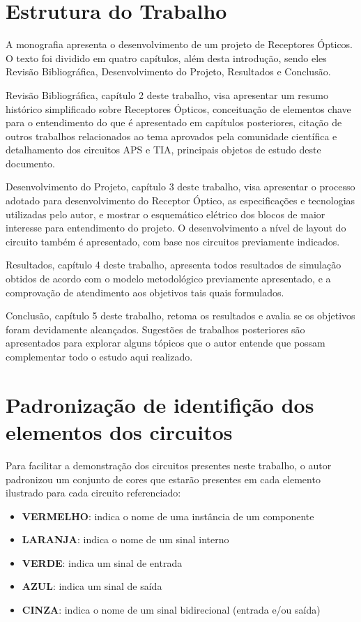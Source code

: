 \section{Estrutura do Trabalho}

A monografia apresenta o desenvolvimento de um projeto de Receptores Ópticos. O texto foi dividido em quatro capítulos, além desta introdução, sendo eles Revisão Bibliográfica, Desenvolvimento do Projeto, Resultados e Conclusão.

Revisão Bibliográfica, capítulo 2 deste trabalho, visa apresentar um resumo histórico simplificado sobre Receptores Ópticos, conceituação de elementos chave para o entendimento do que é apresentado em capítulos posteriores, citação de outros trabalhos relacionados ao tema aprovados pela comunidade científica e detalhamento dos circuitos APS e TIA, principais objetos de estudo deste documento.

Desenvolvimento do Projeto, capítulo 3 deste trabalho, visa apresentar o processo adotado para desenvolvimento do Receptor Óptico, as especificações e tecnologias utilizadas pelo autor, e mostrar o esquemático elétrico dos blocos de maior interesse para entendimento do projeto. O desenvolvimento a nível de layout do circuito também é apresentado, com base nos circuitos previamente indicados.

Resultados, capítulo 4 deste trabalho, apresenta todos resultados de simulação obtidos de acordo com o modelo metodológico previamente apresentado, e a comprovação de atendimento aos objetivos tais quais formulados.

Conclusão, capítulo 5 deste trabalho, retoma os resultados e avalia se os objetivos foram devidamente alcançados. Sugestões de trabalhos posteriores são apresentados para explorar alguns tópicos que o autor entende que possam complementar todo o estudo aqui realizado.

\section{Padronização de identifição dos elementos dos circuitos}
\label{section:padrao_sinais}

Para facilitar a demonstração dos circuitos presentes neste trabalho, o autor padronizou um conjunto de cores que estarão presentes em cada elemento ilustrado para cada circuito referenciado:

\begin{itemize}
    \item \textbf{\color{red}VERMELHO}: indica o nome de uma inst\^ancia de um componente
    \item \textbf{\color{orange}LARANJA}: indica o nome de um sinal interno
    \item \textbf{\color{green}VERDE}: indica um sinal de entrada
    \item \textbf{\color{blue}AZUL}: indica um sinal de sa\'ida
    \item \textbf{\color{gray}CINZA}: indica o nome de um sinal bidirecional (entrada e/ou sa\'ida)
\end{itemize}